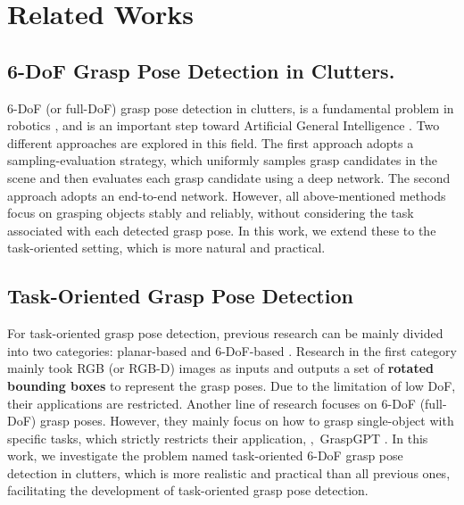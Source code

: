 \section{Related Works}
\subsection{6-DoF Grasp Pose Detection in Clutters.}
6-DoF (or full-DoF) grasp pose detection in clutters, is a fundamental problem in robotics \cite{suarez2018can, dantam2016incremental, xu2024dexterous, gao2024riemann}, and is an important step toward Artificial General Intelligence \cite{shao2020manipulation, avigal2022manipulation, papallas2022manipulation, wang2023event, wang2024pargo, li2024egoexo, chen2024motiongrasp, li2024techcoach, lin2024diversifying, tang2022few, zhao2024harmonizing, tang2024mtvqa, tang2024textsquare, zhao2024tabpedia, lu2024bounding, shan2024mctbench, feng2024docpedia, du2024weakly}. 
Two different approaches are explored in this field. 
The first approach \cite{varley20156-DofGraspoing, GPD} adopts a sampling-evaluation strategy, which uniformly samples grasp candidates in the scene and then evaluates each grasp candidate using a deep network. 
The second approach \cite{6-dofview, fang2020graspnet1billion, ni2020pointnet++grasp, GSNet} adopts an end-to-end network. 
However, all above-mentioned methods focus on grasping objects stably and reliably, without considering the task associated with each detected grasp pose. In this work, we extend these to the task-oriented setting, which is more natural and practical.
\subsection{Task-Oriented Grasp Pose Detection}
For task-oriented grasp pose detection, previous research can be mainly divided into two categories: planar-based \cite{fang2020learningtog, sun2021gater, tang2023graspclip} and 6-DoF-based \cite{SG14000, murali2021same, chen2022TOG, tang2023graspgpt}. 
Research in the first category mainly took RGB (or RGB-D) images as inputs and outputs a set of \textbf{rotated bounding boxes} to represent the grasp poses. 
Due to the limitation of low DoF, their applications are restricted. 
Another line of research focuses on 6-DoF (full-DoF) grasp poses. 
However, they mainly focus on how to grasp single-object with specific tasks, which strictly restricts their application, \eg,~GraspGPT \cite{tang2023graspgpt}. 
In this work, we investigate the problem named task-oriented 6-DoF grasp pose detection in clutters, which is more realistic and practical than all previous ones, facilitating the development of task-oriented grasp pose detection. 
